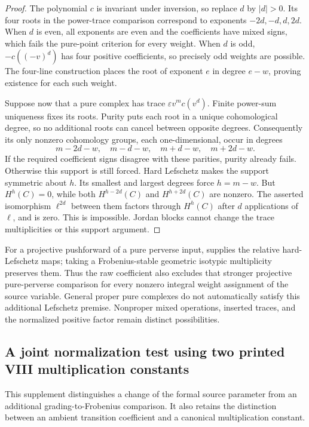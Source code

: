 \documentclass[11pt,a4paper]{article}
\theoremstyle{named}\newtheorem{finding}{Finding}[section]
\theoremstyle{definition}\newtheorem{definition}[finding]{Definition}
\theoremstyle{remark}\newtheorem{remark}[finding]{Remark}
\begin{document}
\begin{proof}
The polynomial \(c\) is invariant under inversion,
so replace \(d\) by \(|d|>0\). Its four roots in
the power-trace comparison correspond to exponents
\(-2d,-d,d,2d\). When \(d\) is even, all exponents
are even and the coefficients have mixed signs, which
fails the pure-point criterion for every weight.
When \(d\) is odd, \(-c((-v)^d)\) has four positive
coefficients, so precisely odd weights are possible.
The four-line construction places the root of exponent
\(e\) in degree \(e-w\), proving existence for each
such weight.

Suppose now that a pure complex has trace
\(\varepsilon v^m c(v^d)\). Finite power-sum uniqueness
fixes its roots. Purity puts each root in a unique
cohomological degree, so no additional roots can cancel
between opposite degrees. Consequently its only
nonzero cohomology groups, each one-dimensional, occur
in degrees
\[
 m-2d-w,\quad m-d-w,\quad m+d-w,\quad m+2d-w.
\]
If the required coefficient signs disagree with these
parities, purity already fails. Otherwise this support
is still forced. Hard Lefschetz makes the support
symmetric about \(h\). Its smallest and largest degrees
force \(h=m-w\). But \(H^h(C)=0\), while both
\(H^{h-2d}(C)\) and \(H^{h+2d}(C)\) are nonzero.
The asserted isomorphism \(\ell^{2d}\) between them
factors through \(H^h(C)\) after \(d\) applications
of \(\ell\), and is zero. This is impossible.
Jordan blocks cannot change the trace multiplicities
or this support argument.
\end{proof}

For a projective pushforward of a pure perverse input,
\cite[5.4.10, p.~144]{BBD} supplies the relative
hard-Lefschetz maps; taking a Frobenius-stable geometric
isotypic multiplicity preserves them. Thus the raw
coefficient also excludes that stronger projective
pure-perverse comparison for every nonzero integral
weight assignment of the source variable. General
proper pure complexes do not automatically satisfy
this additional Lefschetz premise. Nonproper mixed
operations, inserted traces, and the normalized
positive factor remain distinct possibilities.

\subsection{A joint normalization test using two printed VIII multiplication constants}

This supplement distinguishes a change of the formal source
parameter from an additional grading-to-Frobenius comparison.
It also retains the distinction between an ambient transition
coefficient and a canonical multiplication constant.
\end{document}

